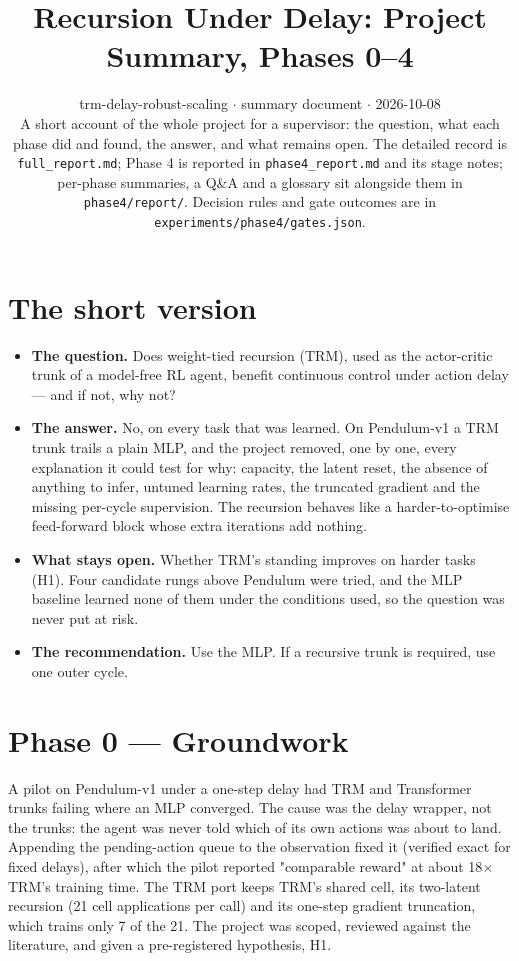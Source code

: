 \documentclass[11pt]{article}
\title{Recursion Under Delay: Project Summary, Phases 0--4}
\author{}
\date{trm-delay-robust-scaling $\cdot$ summary document $\cdot$ 2026-10-08\\[2pt]A short account of the whole project for a supervisor: the question, what each phase did and found, the answer, and what remains open. The detailed record is \texttt{full\_\allowbreak{}report.\allowbreak{}md}; Phase 4 is reported in \texttt{phase4\_\allowbreak{}report.\allowbreak{}md} and its stage notes; per-phase summaries, a Q\&A and a glossary sit alongside them in \texttt{phase4/\allowbreak{}report/\allowbreak{}}. Decision rules and gate outcomes are in \texttt{experiments/\allowbreak{}phase4/\allowbreak{}gates.\allowbreak{}json}.}
\begin{document}
\maketitle
\section*{The short version}



\begin{itemize}
\item \textbf{The question.} Does weight-tied recursion (TRM), used as the actor-critic trunk of a model-free RL agent, benefit continuous control under action delay --- and if not, why not?
\item \textbf{The answer.} No, on every task that was learned. On Pendulum-v1 a TRM trunk trails a plain MLP, and the project removed, one by one, every explanation it could test for why: capacity, the latent reset, the absence of anything to infer, untuned learning rates, the truncated gradient and the missing per-cycle supervision. The recursion behaves like a harder-to-optimise feed-forward block whose extra iterations add nothing.
\item \textbf{What stays open.} Whether TRM's standing improves on harder tasks (H1). Four candidate rungs above Pendulum were tried, and the MLP baseline learned none of them under the conditions used, so the question was never put at risk.
\item \textbf{The recommendation.} Use the MLP. If a recursive trunk is required, use one outer cycle.
\end{itemize}



\medskip



\section*{Phase 0 --- Groundwork}



A pilot on Pendulum-v1 under a one-step delay had TRM and Transformer trunks failing where an MLP converged. The cause was the delay wrapper, not the trunks: the agent was never told which of its own actions was about to land. Appending the pending-action queue to the observation fixed it (verified exact for fixed delays), after which the pilot reported "comparable reward" at about 18$\times$ TRM's training time. The TRM port keeps TRM's shared cell, its two-latent recursion (21 cell applications per call) and its one-step gradient truncation, which trains only 7 of the 21. The project was scoped, reviewed against the literature, and given a pre-registered hypothesis, H1.
\end{document}
